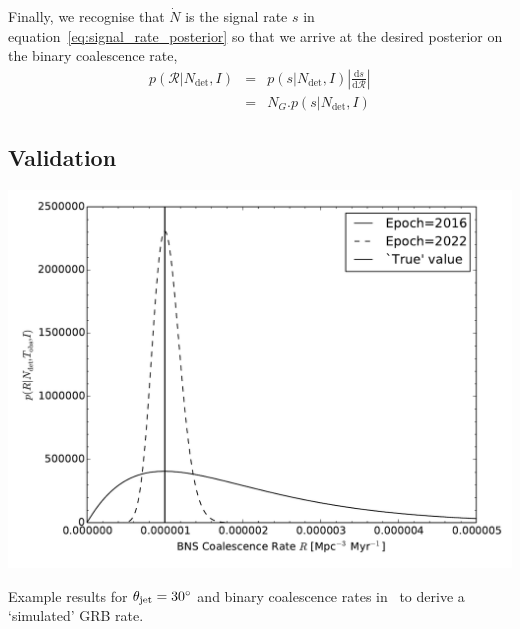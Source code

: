 \documentclass[a0,landscape]{a0poster}
\newcommand{\cbcrate}{{{\mathcal R}}}
\newcommand{\diff}{{\mathrm d}}
\begin{document}
\begin{multicols}{4}
Finally, we recognise that $\dot{N}$ is the signal rate $s$ in
equation~\ref{eq:signal_rate_posterior} so that we arrive at the desired
posterior on the binary coalescence rate, 
%
\begin{eqnarray}
p(\cbcrate|N_{\textrm{det}},I) & = & p(s|N_{\textrm{det}},I) \left|\frac{\diff
s}{\diff \cbcrate}\right| \\
& = & N_G . p(s|N_{\textrm{det}},I)
\end{eqnarray}

\subsection*{Validation}

\begin{center}\vspace{1cm}
    \includegraphics[width=0.5\linewidth]{aligo_rate_re.pdf}
\end{center}\vspace{1cm}

\begin{minipage}{\columnwidth}
  \makeatletter
  \newcommand{\@captype}{figure}
  \makeatother
  \centering
  \qquad%
  \caption{Example results for $\theta_{\rm jet}=30^{\circ}$ and binary
  coalescence rates in~\cite{scenarios} to derive a `simulated' GRB rate.}
\end{minipage}


\end{multicols}
\end{document}
